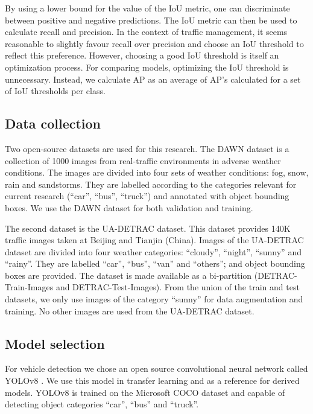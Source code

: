 \documentclass[]{article}
\begin{document}
	By using a lower bound for the value of the IoU metric, one can discriminate between positive and negative predictions. The IoU metric can then be used to calculate recall and precision. In the context of traffic management, it seems reasonable to slightly favour recall over precision and choose an IoU threshold to reflect this preference. However, choosing a good IoU threshold is itself an optimization process. For comparing models, optimizing the IoU threshold is unnecessary. Instead, we calculate AP as an average of AP's calculated for a set of IoU thresholds per class.

\subsection{Data collection}

	Two open-source datasets are used for this research. The DAWN dataset \cite{bw1x-yh39-20} is a collection of 1000 images from real-traffic environments in adverse weather conditions. The images are divided into four sets of weather conditions: fog, snow, rain and sandstorms. They are labelled according to the categories relevant for current research (``car'', ``bus'', ``truck'') and annotated with object bounding boxes. We use the DAWN dataset for both validation and training. 
	
	The second dataset is the UA-DETRAC \cite{CVIU_UA-DETRAC} dataset. This dataset provides 140K traffic images taken at Beijing and Tianjin (China). Images of the UA-DETRAC dataset are divided into four weather categories: ``cloudy'', ``night'', ``sunny'' and ``rainy''. They are labelled ``car'', ``bus'', ``van'' and ``others''; and object bounding boxes are provided. The dataset is made available as a bi-partition (DETRAC-Train-Images and DETRAC-Test-Images). From the union of the train and test datasets, we only use images of the category ``sunny'' for data augmentation and training. No other images are used from the UA-DETRAC dataset.

\subsection{Model selection}
 
	For vehicle detection we chose an open source convolutional neural network called YOLO{\small v8} \cite{yolov8_ultralytics}. We use this model in transfer learning and as a reference for derived models. YOLO{\small v8} is trained on the Microsoft COCO dataset \cite{linMicrosoftCOCOCommon2015a} and capable of detecting object categories ``car'', ``bus'' and ``truck''. 
 
\end{document}
